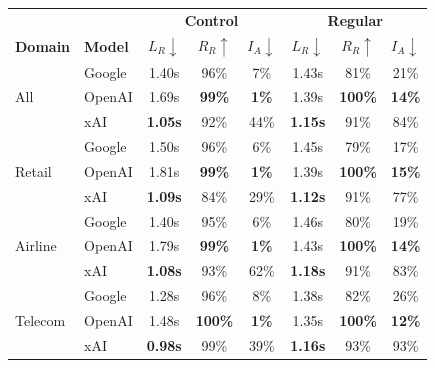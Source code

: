 \begin{tabular}{@{}ll|ccc|ccc@{}}
\toprule
 & & \multicolumn{3}{c|}{\textbf{Control}} & \multicolumn{3}{c}{\textbf{Regular}} \\
\textbf{Domain} & \textbf{Model} & $L_R\downarrow$ & $R_R\uparrow$ & $I_A\downarrow$ & $L_R\downarrow$ & $R_R\uparrow$ & $I_A\downarrow$ \\
\midrule
\multirow{3}{*}{All} & Google & 1.40s & 96\% & 7\% & 1.43s & 81\% & 21\% \\
 & OpenAI & 1.69s & \textbf{99\%} & \textbf{1\%} & 1.39s & \textbf{100\%} & \textbf{14\%} \\
 & xAI & \textbf{1.05s} & 92\% & 44\% & \textbf{1.15s} & 91\% & 84\% \\
\midrule
\multirow{3}{*}{Retail} & Google & 1.50s & 96\% & 6\% & 1.45s & 79\% & 17\% \\
 & OpenAI & 1.81s & \textbf{99\%} & \textbf{1\%} & 1.39s & \textbf{100\%} & \textbf{15\%} \\
 & xAI & \textbf{1.09s} & 84\% & 29\% & \textbf{1.12s} & 91\% & 77\% \\
\midrule
\multirow{3}{*}{Airline} & Google & 1.40s & 95\% & 6\% & 1.46s & 80\% & 19\% \\
 & OpenAI & 1.79s & \textbf{99\%} & \textbf{1\%} & 1.43s & \textbf{100\%} & \textbf{14\%} \\
 & xAI & \textbf{1.08s} & 93\% & 62\% & \textbf{1.18s} & 91\% & 83\% \\
\midrule
\multirow{3}{*}{Telecom} & Google & 1.28s & 96\% & 8\% & 1.38s & 82\% & 26\% \\
 & OpenAI & 1.48s & \textbf{100\%} & \textbf{1\%} & 1.35s & \textbf{100\%} & \textbf{12\%} \\
 & xAI & \textbf{0.98s} & 99\% & 39\% & \textbf{1.16s} & 93\% & 93\% \\
\bottomrule
\end{tabular}